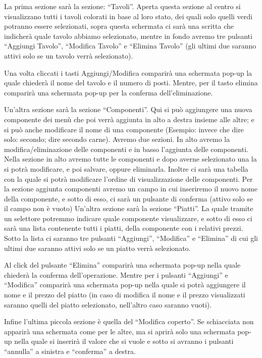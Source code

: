 \documentclass[12pt, letterpaper]{book}
\begin{document}
La prima sezione sarà la sezione: “Tavoli”. Aperta questa sezione al centro si visualizzano tutti i tavoli colorati in base al loro stato, dei quali solo quelli verdi potranno essere selezionati, sopra questa schermata ci sarà una scritta che indicherà quale tavolo abbiamo selezionato, mentre in fondo avremo tre pulsanti “Aggiungi Tavolo”, “Modifica Tavolo” e “Elimina Tavolo” (gli ultimi due saranno attivi solo se un tavolo verrà selezionato).

Una volta cliccati i tasti Aggiungi/Modifica comparirà una schermata pop-up la quale chiederà il nome del tavolo e il numero di posti. Mentre, per il tasto elimina comparirà una schermata pop-up per la conferma dell'eliminazione.

Un'altra sezione sarà la sezione “Componenti”. Qui si può aggiungere una nuova componente dei menù che poi verrà aggiunta in alto a destra insieme alle altre; e si può anche modificare il nome di una componente (Esempio: invece che dire solo: secondo; dire secondo carne). Avremo due sezioni. In alto avremo la modifica/eliminazione delle componenti e in basso l'aggiunta delle componenti. Nella sezione in alto avremo tutte le componenti e dopo averne selezionato una la si potrà modificare, e poi salvare, oppure eliminarla. Inoltre ci sarà una tabella con la quale si potrà modificare l'ordine di visualizzazione delle componenti. Per la sezione aggiunta componenti avremo un campo in cui inseriremo il nuovo nome della componente, e sotto di esso, ci sarà un pulsante di conferma (attivo solo se il campo non è vuoto)
Un'altra sezione sarà la sezione “Piatti”. La quale tramite un selettore potremmo indicare quale componente visualizzare, e sotto di esso ci sarà una lista contenente tutti i piatti, della componente con i relativi prezzi. Sotto la lista ci saranno tre pulsanti “Aggiungi”, “Modifica” e “Elimina” di cui gli ultimi due saranno attivi solo se un piatto verrà selezionato.

Al click del pulsante “Elimina” comparirà una schermata pop-up nella quale chiederà la conferma dell'operazione. Mentre per i pulsanti “Aggiungi” e “Modifica” comparirà una schermata pop-up nella quale si potrà aggiungere il nome e il prezzo del piatto (in caso di modifica il nome e il prezzo visualizzati saranno quelli del piatto selezionato, nell'altro caso saranno vuoti).

Infine l'ultima piccola sezione è quella del “Modifica coperto”. Se schiacciata non apparirà una schermata come per le altre, ma si aprirà solo una schermata pop-up nella quale si inserirà il valore che si vuole e sotto si avranno i pulsanti “annulla” a sinistra e “conferma” a destra.
\end{document}
